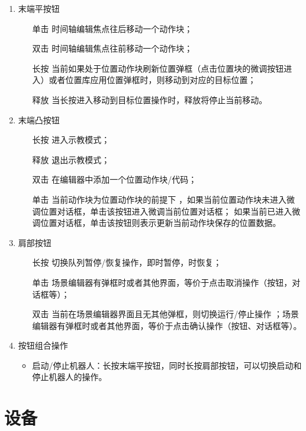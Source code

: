 \begin{enumerate}[label=(\arabic*)]
	\item 末端平按钮
	\begin{itemize}
		\item[单击] 时间轴编辑焦点往后移动一个动作块；
		\item[双击] 时间轴编辑焦点往前移动一个动作块；
		\item[长按] 当前如果处于位置动作块刷新位置弹框（点击位置块的微调按钮进入）或者位置库应用位置弹框时，则移动到对应的目标位置；
		\item[释放] 当长按进入移动到目标位置操作时，释放将停止当前移动。
	\end{itemize}

	\item 末端凸按钮
	\begin{itemize}
		\item[长按] 进入示教模式；
		\item[释放] 退出示教模式；
		\item[双击] 在编辑器中添加一个位置动作块/代码；
		\item[单击] 当前动作块为位置动作块的前提下 ，如果当前位置动作块未进入微调位置对话框，单击该按钮进入微调当前位置对话框； 如果当前已进入微调位置对话框，单击该按钮则表示更新当前动作块保存的位置数据。
	\end{itemize}

	\item 肩部按钮
	\begin{itemize}
		\item[长按] 切换队列暂停/恢复操作，即时暂停，时恢复；
		\item[单击] 场景编辑器有弹框时或者其他界面，等价于点击取消操作（按钮，对话框等）；
		\item[双击] 当前在场景编辑器界面且无其他弹框，则切换运行/停止操作 ；场景编辑器有弹框时或者其他界面，等价于点击确认操作（按钮、对话框等）。
	\end{itemize}

	\item 按钮组合操作
	\begin{itemize}
		\item 启动/停止机器人：长按末端平按钮，同时长按肩部按钮，可以切换启动和停止机器人的操作。

	\end{itemize}
\end{enumerate}

\section{设备}

